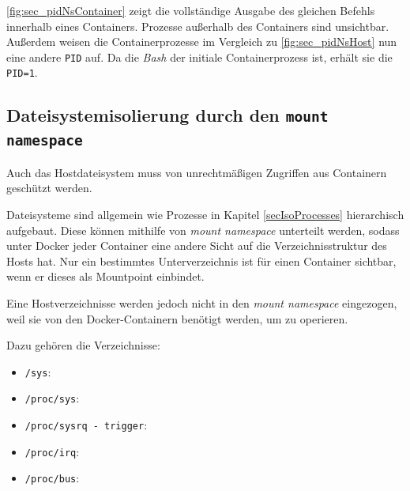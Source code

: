 \documentclass[../main.tex]{subfiles}
\begin{document}
			\fig \ref{fig:sec_pidNsContainer} zeigt die vollständige Ausgabe des gleichen Befehls innerhalb eines Containers. Prozesse außerhalb des Containers sind unsichtbar. Außerdem weisen die Containerprozesse im Vergleich zu \fig \ref{fig:sec_pidNsHost} nun eine andere \texttt{PID} auf. Da die \emph{Bash} der initiale Containerprozess ist, erhält sie die \texttt{PID=1}.






    \subsection{Dateisystemisolierung durch den \texttt{mount namespace}}
			Auch das Hostdateisystem muss von unrechtmäßigen Zugriffen aus Containern geschützt werden.

			Dateisysteme sind allgemein wie Prozesse in Kapitel \ref{secIsoProcesses} hierarchisch aufgebaut. Diese können mithilfe von \emph{mount namespace} unterteilt werden, sodass unter Docker jeder Container eine andere Sicht auf die Verzeichnisstruktur des Hosts hat. Nur ein bestimmtes Unterverzeichnis ist für einen Container sichtbar, wenn er dieses als Mountpoint einbindet.

			Eine Hostverzeichnisse werden jedoch nicht in den \emph{mount namespace} eingezogen, weil sie von den Docker-Containern benötigt werden, um zu operieren.

			Dazu gehören die Verzeichnisse:

			\begin{itemize}
				\item \texttt{/sys}:
				\item \texttt{/proc/sys}:
				\item \texttt{/proc/sysrq - trigger}:
				\item \texttt{/proc/irq}:
				\item \texttt{/proc/bus}:
			\end{itemize}
\end{document}

